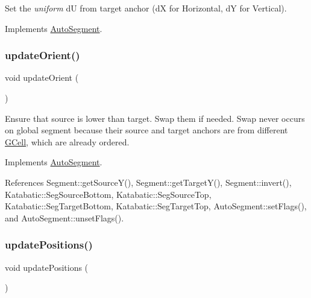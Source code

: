 Set the {\itshape uniform} {\ttfamily dU} from target anchor (dX for Horizontal, dY for Vertical). 

Implements \mbox{\hyperlink{classKatabatic_1_1AutoSegment_a246756d4c8b3e094a0a9d6de3c2109ff}{Auto\+Segment}}.

\mbox{\label{classKatabatic_1_1AutoVertical_a59058f4593049c583c5b3698ff81b299}} 
\subsubsection{\texorpdfstring{update\+Orient()}{updateOrient()}}
{\footnotesize\ttfamily void update\+Orient (\begin{DoxyParamCaption}{ }\end{DoxyParamCaption})\hspace{0.3cm}{\ttfamily [virtual]}}

Ensure that source is lower than target. Swap them if needed. Swap never occurs on global segment because their source and target anchors are from different \mbox{\hyperlink{classKatabatic_1_1GCell}{G\+Cell}}, which are already ordered. 

Implements \mbox{\hyperlink{classKatabatic_1_1AutoSegment_a102e0f4bbb0386e41be214d15a9e4549}{Auto\+Segment}}.



References Segment\+::get\+Source\+Y(), Segment\+::get\+Target\+Y(), Segment\+::invert(), Katabatic\+::\+Seg\+Source\+Bottom, Katabatic\+::\+Seg\+Source\+Top, Katabatic\+::\+Seg\+Target\+Bottom, Katabatic\+::\+Seg\+Target\+Top, Auto\+Segment\+::set\+Flags(), and Auto\+Segment\+::unset\+Flags().

\mbox{\label{classKatabatic_1_1AutoVertical_a9662a77c2ed8553d6a0312c5292060ad}} 
\subsubsection{\texorpdfstring{update\+Positions()}{updatePositions()}}
{\footnotesize\ttfamily void update\+Positions (\begin{DoxyParamCaption}{ }\end{DoxyParamCaption})\hspace{0.3cm}{\ttfamily [virtual]}}

